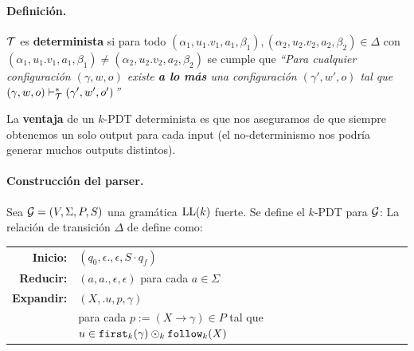     \paragraph{Definición.} $\mathcal{T}$ es \textbf{determinista} si para todo $\left(\alpha_1, u_1.v_1, a_1, \beta_1\right),\left(\alpha_2, u_2.v_2, a_2, \beta_2\right) \in \Delta$ con \\
$\left(\alpha_1, u_1.v_1, a_1, \beta_1\right) \neq\left(\alpha_2, u_2.v_2, a_2, \beta_2\right)$ se cumple que
    \textit{``Para cualquier configuración $(\gamma, w, o)$ existe \textbf{a lo más} una configuración $(\gamma', w', o)$ tal que $(\gamma,w,o) \vdash_{\mathcal{T}}^* (\gamma',w', o')$''} \medbreak

    La \textbf{ventaja} de un $k$-PDT determinista es que nos aseguramos de que siempre obtenemos un solo output para cada input (el no-determinismo nos podría generar muchos outputs distintos).

    \paragraph{Construcción del parser.} Sea $\mathcal{G}=(V,\Sigma, P, S)$ una gramática $\text{LL}(k)$ fuerte. Se define el $k$-PDT para $\mathcal{G}$:
    La relación de transición $\Delta$ de define como:
    \begin{table}[H]
        \centering
        \begin{tabular}{rl}
            \textbf{Inicio:}   & $(q_0, \epsilon., \epsilon, S\cdot q_f)$                                                \\
            \textbf{Reducir:}  & $(a, a., \epsilon, \epsilon)$ para cada $a \in \Sigma$                                  \\
            \textbf{Expandir:} & $(X, .u, p, \gamma)$                                                                    \\
                               & para cada $p:=(X\to\gamma) \in P$ tal que $u \in \texttt{first}_k(\gamma) \odot_k \texttt{follow}_k(X)$
        \end{tabular}
    \end{table}

